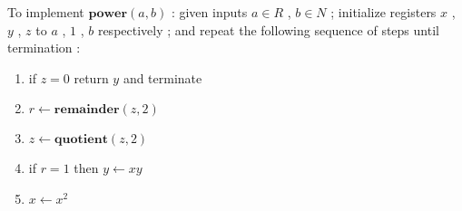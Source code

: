 \documentclass{article}
\begin{document}
To implement $ \mathbf{power}(a,b) $ :
given inputs $ a \in R $ , $ b \in N $ ;
initialize registers $ x $ , $ y $ , $ z $ to
$ a $ , $ 1 $ , $ b $ respectively ; and
repeat the following sequence of steps until termination :

\begin{enumerate}
\item if $ z = 0 $ return $ y $ and terminate
\item $ r \leftarrow \mathbf{remainder}(z,2) $
\item $ z \leftarrow \mathbf{quotient}(z,2) $
\item if $ r = 1 $ then $ y \leftarrow xy $
\item $ x \leftarrow x^2 $
\end{enumerate}
\end{document}
